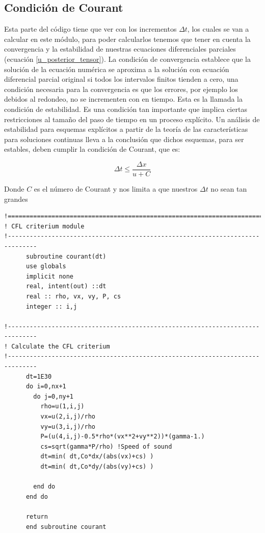 \documentclass[12pt,a4paper]{book}
\begin{document}
\subsection{Condición de Courant}
Esta parte del código tiene que ver con los incrementos $\Delta t$, los cuales se van a calcular en este módulo, para poder calcularlos tenemos que tener en cuenta la convergencia y la estabilidad de nuestras ecuaciones diferenciales parciales (ecuación \ref{u_posterior_tensor}). La condición de convergencia establece que la solución de la ecuación numérica se aproxima a la solución con ecuación diferencial parcial original si todos los intervalos finitos tienden a cero, una condición necesaria para la convergencia es que los errores, por ejemplo los debidos al redondeo, no se incrementen con en tiempo. Esta es la llamada la condición de estabilidad. Es una condición tan importante que implica ciertas restricciones al tamaño del paso de tiempo en un proceso explícito. Un análisis de estabilidad para esquemas explícitos a partir de la teoría de las características para soluciones continuas lleva a la conclusión que dichos esquemas, para ser estables, deben cumplir la condición de Courant, que es: 

\begin{equation}
\Delta t \leq \frac{\Delta x}{u+C}
\end{equation}

Donde $C$ es el número de Courant y nos limita a que nuestros $\Delta t$ no sean tan grandes
\begin{lstlisting}[frame=single]
!==============================================================================
! CFL criterium module
!------------------------------------------------------------------------------
      subroutine courant(dt)
      use globals
      implicit none
      real, intent(out) ::dt
      real :: rho, vx, vy, P, cs
      integer :: i,j

!------------------------------------------------------------------------------
! Calculate the CFL criterium
!------------------------------------------------------------------------------
      dt=1E30
      do i=0,nx+1
        do j=0,ny+1
          rho=u(1,i,j)
          vx=u(2,i,j)/rho
          vy=u(3,i,j)/rho
          P=(u(4,i,j)-0.5*rho*(vx**2+vy**2))*(gamma-1.)
          cs=sqrt(gamma*P/rho) !Speed of sound
          dt=min( dt,Co*dx/(abs(vx)+cs) )
          dt=min( dt,Co*dy/(abs(vy)+cs) )

        end do
      end do

      return
      end subroutine courant

\end{lstlisting}
\end{document}
